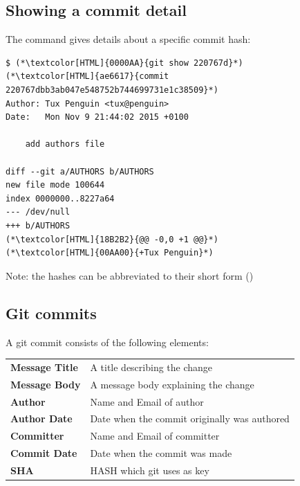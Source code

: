 \subsection{Showing a commit detail}
\begin{frame}[fragile]
  \subslidetitle
  The  command gives details about a specific commit hash:

\begin{lstlisting}
$ (*\textcolor[HTML]{0000AA}{git show 220767d}*)
(*\textcolor[HTML]{ae6617}{commit 220767dbb3ab047e548752b744699731e1c38509}*)
Author: Tux Penguin <tux@penguin>
Date:   Mon Nov 9 21:44:02 2015 +0100

    add authors file

diff --git a/AUTHORS b/AUTHORS
new file mode 100644
index 0000000..8227a64
--- /dev/null
+++ b/AUTHORS
(*\textcolor[HTML]{18B2B2}{@@ -0,0 +1 @@}*)
(*\textcolor[HTML]{00AA00}{+Tux Penguin}*)
\end{lstlisting}

  \vspace{1em}
  Note: the hashes can be abbreviated to their short form ()
\end{frame}

\subsection{Git commits}
\begin{frame}[fragile]
  \subslidetitle
  A git commit consists of the following elements:\\
  \vspace{1em}
  \begin{tabular}{lp{8cm}}
    \pause
    \textbf{Message Title} & A title describing the change \\
    \pause
    \textbf{Message Body} & A message body explaining the change \\
    \pause
    \textbf{Author} & Name and Email of author \\
    \pause
    \textbf{Author Date} & Date when the commit originally was authored \\
    \pause
    \textbf{Committer} & Name and Email of committer \\
    \pause
    \textbf{Commit Date} & Date when the commit was made \\
    \pause
    \textbf{SHA} & HASH which git uses as key \\
  \end{tabular}
\end{frame}


